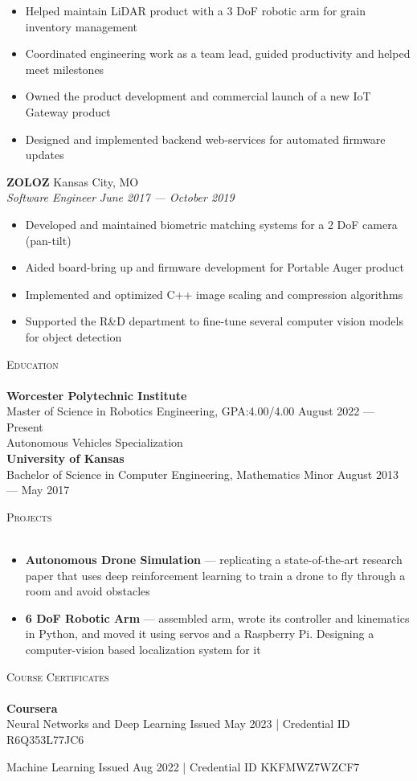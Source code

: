 \documentclass[a4paper]{article}
\newcommand{\lineunder} {
    \vspace*{-8pt} \\
    \hspace*{-18pt} \hrulefill \\
}
\newcommand{\header} [1] {
    {\hspace*{-18pt}\vspace*{6pt} \textsc{#1}}
    \vspace*{-6pt} \lineunder
}
\begin{document}
\begin{itemize} \itemsep 1pt
	\item Helped maintain LiDAR product with a 3 DoF robotic arm for grain inventory management
	\item Coordinated engineering work as a team lead, guided productivity and helped meet milestones
	\item Owned the product development and commercial launch of a new IoT Gateway product
	\item Designed and implemented backend web-services for automated firmware updates
\end{itemize}
\textbf{ZOLOZ} \hfill Kansas City, MO\\
\textit{Software Engineer} \hfill \textit{June 2017 --- October 2019}\\
\vspace{-1mm}
\begin{itemize} \itemsep 1pt
	\item Developed and maintained biometric matching systems for a 2 DoF camera (pan-tilt)
	\item Aided board-bring up and firmware development for Portable Auger product
	\item Implemented and optimized C++ image scaling and compression algorithms
	\item Supported the R\&D department to fine-tune several computer vision models for object detection
\end{itemize}

\header{Education}
\textbf{Worcester Polytechnic Institute}\\
Master of Science in Robotics Engineering, GPA:\@ 4.00/4.00 \hfill August 2022 --- Present\\
Autonomous Vehicles Specialization\\
\vspace{2mm}
\textbf{University of Kansas}\\
Bachelor of Science in Computer Engineering, Mathematics Minor \hfill August 2013 --- May 2017\\

\vspace{2mm}

\header{Projects}
\vspace{-1mm}
\begin{itemize} \itemsep 1pt
    \item \textbf{Autonomous Drone Simulation} --- replicating a state-of-the-art research paper that uses deep reinforcement
    learning to train a drone to fly through a room and avoid obstacles
    \item \textbf{6 DoF Robotic Arm} --- assembled arm, wrote its controller and kinematics in Python, and moved it using servos and a Raspberry Pi. Designing a computer-vision based localization system for it
\end{itemize}


\header{Course Certificates}
{\textbf{Coursera}}\\
\vspace{1.75mm}
Neural Networks and Deep Learning \hfill Issued May 2023 | \footnotesize{Credential ID R6Q353L77JC6}

\normalsize{}

\vspace{1mm}
Machine Learning \hfill Issued Aug 2022 | \footnotesize{Credential ID KKFMWZ7WZCF7}
\end{document}
